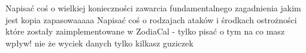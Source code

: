 Napisać coś o wielkiej konieczności zawarcia fundamentalnego zagadnienia jakim jest kopia zapasowaaaaa
Napisać coś o rodzajach ataków i środkach ostrożności które zostały zaimplementowane w ZodiaCal - tylko pisać o tym na co masz wpływ! nie że wyciek danych tylko kilkasz guziczek 
 